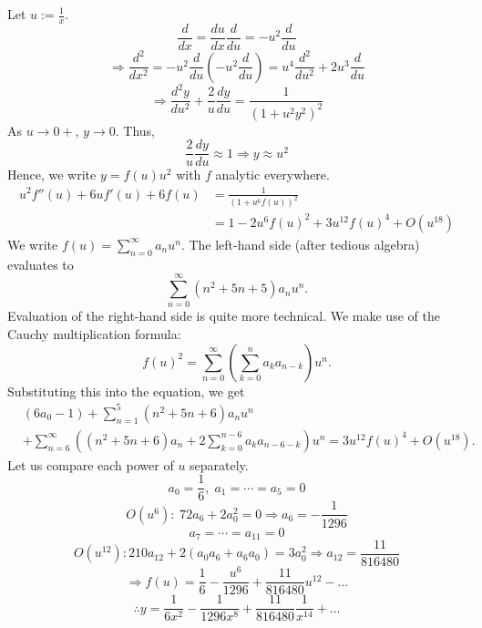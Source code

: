 \item
Let $u := \frac{1}{x}$.
\[
	\frac{d}{dx} = \frac{du}{dx}\frac{d}{du} = -u^2\frac{d}{du}
\]
\[
	\Rightarrow \frac{d^2}{dx^2} = -u^2\frac{d}{du} \left(-u^2 \frac{d}{du}\right)
	= u^4 \frac{d^2}{du^2} + 2u^3\frac{d}{du}
\]
\[
	\Rightarrow \frac{d^2 y}{du^2} + \frac{2}{u}\frac{dy}{du} = \frac{1}{{\left( 1 + u^2 y^2 \right)}^2}
\]
As $u \rightarrow 0+$, $y \rightarrow 0$. Thus,
\[
	\frac{2}{u}\frac{dy}{du} \approx 1
	\Rightarrow y \approx u^2
\]
Hence, we write $y = f(u) u^2$ with $f$ analytic everywhere.
\begin{align*}
	u^2 f''(u) + 6u f'(u) + 6f(u)
	 & = \frac{1}{{\left( 1 + u^6 f(u) \right)}^2}                     \\
	 & = 1 - 2u^6 {f(u)}^2 + 3u^{12} {f(u)}^4 + O\left( u^{18} \right)
\end{align*}
We write $f(u) = \sum_{n=0}^\infty a_n u^n$.
The left-hand side (after tedious algebra) evaluates to
\[
	\sum_{n=0}^\infty \left( n^2 + 5n + 5 \right) a_n u^n.
\]
Evaluation of the right-hand side is quite more technical.
We make use of the Cauchy multiplication formula:
\[
	{f(u)}^2 = \sum_{n=0}^\infty \left( \sum_{k=0}^n a_k a_{n - k} \right) u^n.
\]
Substituting this into the equation, we get
\begin{align*}
	 & (6a_0 - 1)
	+ \sum_{n=1}^5 \left( n^2 + 5n + 6 \right) a_n u^n                                                                 \\
	 & + \sum_{n=6}^\infty \left( \left( n^2 + 5n + 6 \right) a_n + 2 \sum_{k=0}^{n - 6} a_k a_{n - 6 - k} \right) u^n
	= 3u^{12} {f(u)}^4 + O(u^{18}).
\end{align*}
Let us compare each power of $u$ separately.
\[
	a_0 = \frac{1}{6},\; a_1 = \cdots = a_5 = 0
\]
\[
	O(u^6):\; 72a_6 + 2a_0^2 = 0
	\Rightarrow a_6 = -\frac{1}{1296}
\]
\[
	a_7 = \cdots = a_{11} = 0
\]
\[
	O(u^{12}): 210a_{12} + 2 \left( a_0 a_6 + a_6 a_0 \right) = 3a_0^2
	\Rightarrow a_{12} = \frac{11}{816480}
\]
\[
	\Rightarrow f(u) = \frac{1}{6} - \frac{u^6}{1296} + \frac{11}{816480}u^{12} - \dots
\]
\[
	\therefore y = \frac{1}{6x^2} - \frac{1}{1296x^8} + \frac{11}{816480}\frac{1}{x^{14}} + \dots
\]